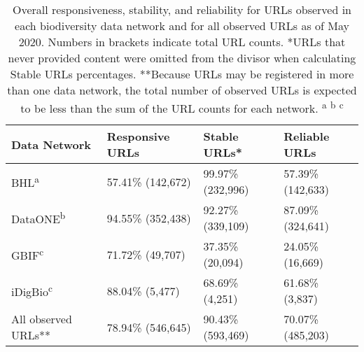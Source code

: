 \begin{table}[!ht]
\begin{adjustwidth}{0in}{0in} %
\centering
\begin{tabular}{llll}
\hline
{\bf Data Network} & {\bf Responsive URLs} & {\bf Stable URLs*} & {\bf Reliable URLs} \\ \hline
BHL\textsuperscript{a} & 57.41\% (142,672) & 99.97\% (232,996) & 57.39\% (142,633) \\
DataONE\textsuperscript{b} & 94.55\% (352,438) & 92.27\% (339,109) & 87.09\% (324,641) \\
GBIF\textsuperscript{c} & 71.72\% (49,707) & 37.35\% (20,094) & 24.05\% (16,669) \\
iDigBio\textsuperscript{c} & 88.04\% (5,477) & 68.69\% (4,251) & 61.68\% (3,837)  \\
All observed URLs** & 78.94\% (546,645) & 90.43\% (593,469) & 70.07\% (485,203) \\ \hline
\end{tabular}
\caption{Overall responsiveness, stability, and reliability for URLs observed in each biodiversity data network and for all observed URLs as of May 2020. Numbers in brackets indicate total URL counts.
*URLs that never provided content were omitted from the divisor when calculating Stable URLs percentages.
**Because URLs may be registered in more than one data network, the total number of observed URLs is expected to be less than the sum of the URL counts for each network.
\textsuperscript{a}\citet{poelen_jorrit_h_2019_3484555}
\textsuperscript{b}\citet{poelen_jorrit_h_2019_3483218}
\textsuperscript{c}\citet{poelen_jorrit_h_2019_3484205}
}
\label{table1}
\end{adjustwidth}
\end{table}
